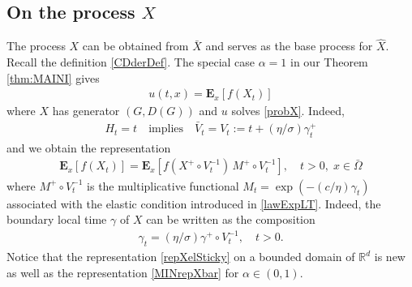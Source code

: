 \documentclass[11pt,a4paper]{article}
\newcommand{\magenta}{black}
\begin{document}
\subsection{On the process $X$}
\label{sec:OnX}
{\color{\magenta} The process $X$ can be obtained from $\bar{X}$ and serves as the base process for $\hat{X}$.} Recall the definition \eqref{CDderDef}. The special case $\alpha=1$ in our Theorem \ref{thm:MAINI} gives
\begin{align*}
u(t,x) = \mathbf{E}_x[f(X_t)]
\end{align*} 
where $X$ has generator $(G,D(G))$ and $u$ solves \eqref{probX}. Indeed, 
\begin{align*}
H_t = t \quad \textrm{implies} \quad \bar{V}_t = V_t:=t + (\eta/\sigma) \gamma^+_t
\end{align*} 
and we obtain the representation 
\begin{align}
\label{repXelSticky}
\mathbf{E}_x[f(X_t)] = \mathbf{E}_x[f(X^+ \circ V^{-1}_t)\, M^+ \circ V^{-1}_t], \quad t>0,\; x \in \bar{\Omega}
\end{align}
where $M^+ \circ V^{-1}_t$ is the multiplicative functional $M_t = \exp\left( - (c/\eta) \gamma_t\right)$  associated with the elastic condition introduced in \eqref{lawExpLT}. Indeed, the boundary local time $\gamma$ of $X$ can be written as the composition 
\begin{align}
\label{equivgamma}
\gamma_t = (\eta/\sigma)\gamma^+ \circ V^{-1}_t, \quad t>0.
\end{align}
Notice that the representation \eqref{repXelSticky} on a bounded domain of $\mathbb{R}^d$ is new as well as the representation \eqref{MINrepXbar} for $\alpha \in (0,1)$. 
\end{document}
